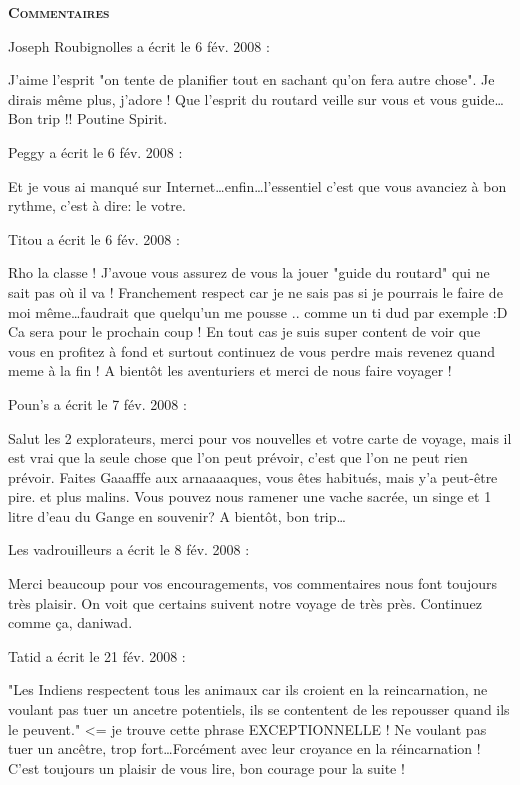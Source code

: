 \bigskip
\textbf{\textsc{Commentaires}}

\medskip
Joseph Roubignolles a écrit le 6 fév. 2008 :
\begin{displayquote}
J'aime l'esprit "on tente de planifier tout en sachant qu'on fera autre chose". Je dirais même plus, j'adore ! Que l'esprit du routard veille sur vous et vous guide\dots
Bon trip !!
Poutine Spirit.
\end{displayquote}

\medskip
Peggy a écrit le 6 fév. 2008 :
\begin{displayquote}
Et je vous ai manqué sur Internet\dots enfin\dots l'essentiel c'est que vous avanciez à bon rythme, c'est à dire: le votre.
\end{displayquote}

\medskip
Titou a écrit le 6 fév. 2008 :
\begin{displayquote}
Rho la classe ! J'avoue vous assurez de vous la jouer "guide du routard" qui ne sait pas où il va ! Franchement respect car je ne sais pas si je pourrais le faire de moi même\dots faudrait que quelqu'un me pousse .. comme un ti dud par exemple :D Ca sera pour le prochain coup ! En tout cas je suis super content de voir que vous en profitez à fond et surtout continuez de vous perdre mais revenez quand meme à la fin ! A bientôt les aventuriers et merci de nous faire voyager !
\end{displayquote}

\medskip
Poun's a écrit le 7 fév. 2008 :
\begin{displayquote}
Salut  les 2 explorateurs, merci pour vos nouvelles et votre carte de voyage, mais il est vrai que la seule chose que l'on peut prévoir, c'est que l'on ne peut rien prévoir. Faites Gaaafffe aux arnaaaaques, vous êtes habitués, mais y'a peut-être pire. et plus malins.
Vous pouvez nous ramener une vache sacrée, un singe et 1 litre d'eau du Gange en souvenir?
A bientôt, bon trip\dots
\end{displayquote}

\medskip
Les vadrouilleurs a écrit le 8 fév. 2008 :
\begin{displayquote}
Merci beaucoup pour vos encouragements, vos commentaires nous font toujours très plaisir. On voit que certains suivent notre voyage de très près.
Continuez comme ça, daniwad.
\end{displayquote}

\medskip
Tatid a écrit le 21 fév. 2008 :
\begin{displayquote}
"Les Indiens respectent tous les animaux car ils croient en la reincarnation, ne voulant pas tuer un ancetre potentiels, ils se contentent de les repousser quand ils le peuvent." <= je trouve cette phrase EXCEPTIONNELLE ! Ne voulant pas tuer un ancêtre, trop fort\dots Forcément avec leur croyance en la réincarnation !
C'est toujours un plaisir de vous lire, bon courage pour la suite !
\end{displayquote}

\vfill
